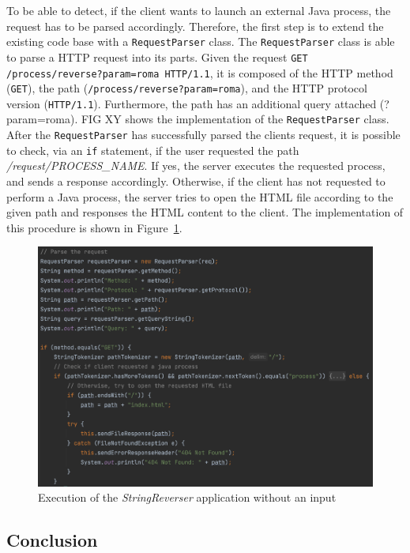 \documentclass{article}
\def\Fig#1{Figure~\ref{#1}}
\begin{document}
To be able to detect, if the client wants to launch an external Java process, the request has to be parsed accordingly. Therefore, the first step is to extend the existing code base with a \texttt{RequestParser} class. The \texttt{RequestParser} class is able to parse a HTTP request into its parts. Given the request \texttt{GET /process/reverse?param=roma HTTP/1.1}, it is composed of the HTTP method (\texttt{GET}), the path (\texttt{/process/reverse?param=roma}), and the HTTP protocol version (\texttt{HTTP/1.1}). Furthermore, the path has an additional query attached (?param=roma). FIG XY shows the implementation of the \texttt{RequestParser} class.
After the \texttt{RequestParser} has successfully parsed the clients request, it is possible to check, via an \texttt{if} statement, if the user requested the path \textit{/request/PROCESS\_NAME}. If yes, the server executes the requested process, and sends a response accordingly. Otherwise, if the client has not requested to perform a Java process, the server tries to open the HTML file according to the given path and responses the HTML content to the client. The implementation of this procedure is shown in \Fig{fig:01_part1_impl_tinyhttpd_parsing}.
\begin{figure}[h]
\centering
\includegraphics[scale=0.4]{images/TinyHttpdParsing}
\caption{Execution of the \textit{StringReverser} application without an input}
\label{fig:01_part1_impl_tinyhttpd_parsing}
\end{figure}



\subsection{Conclusion}\label{subsec:01_part1_concl}
\end{document}

